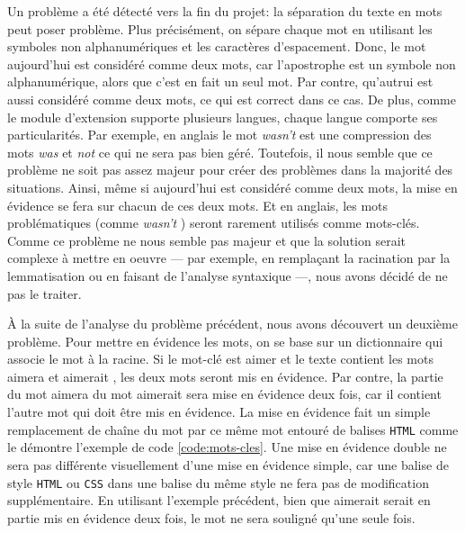Un probl\`eme a \'et\'e d\'etect\'e vers la fin du projet: la s\'eparation du texte en mots peut poser probl\`eme.
Plus pr\'ecis\'ement, on s\'epare chaque mot en utilisant les symboles non alphanum\'eriques et les caract\`eres d'espacement.
Donc, le mot \og aujourd'hui \fg{} est consid\'er\'e comme deux mots, car l'apostrophe est un symbole non alphanum\'erique, alors que c'est en fait un seul mot.
Par contre, \og qu'autrui \fg{} est aussi consid\'er\'e comme deux mots, ce qui est correct dans ce cas.
De plus, comme le module d'extension supporte plusieurs langues, chaque langue comporte ses particularit\'es.
Par exemple, en anglais le mot \og \textit{wasn't} \fg{} est une compression des mots \og \textit{was} \fg{} et \og \textit{not} \fg{} ce qui ne sera pas bien g\'er\'e.
Toutefois, il nous semble que ce probl\`eme ne soit pas assez majeur pour cr\'eer des probl\`emes dans la majorit\'e des situations.
Ainsi, m\^eme si \og aujourd'hui \fg{} est consid\'er\'e comme deux mots, la mise en \'evidence se fera sur chacun de ces deux mots.
Et en anglais, les mots probl\'ematiques (comme \og \textit{wasn't} \fg{}) seront rarement utilis\'es comme mots-cl\'es.
Comme ce probl\`eme ne nous semble pas majeur et que la solution serait complexe \`a mettre en oeuvre --- par exemple, en rempla\c{c}ant la racination par la lemmatisation ou en faisant de l'analyse syntaxique ---, nous avons d\'ecidé de ne pas le traiter.

\`A la suite de l'analyse du probl\`eme pr\'ec\'edent, nous avons d\'ecouvert un deuxi\`eme probl\`eme.
Pour mettre en \'evidence les mots, on se base sur un dictionnaire qui associe le mot \`a la racine.
Si le mot-cl\'e est \og aimer \fg{} et le texte contient les mots \og aimera \fg{} et \og aimerait \fg{}, les deux mots seront mis en \'evidence.
Par contre, la partie du mot \og aimera \fg{} du mot \og aimerait \fg{} sera mise en \'evidence deux fois, car il contient l'autre mot qui doit \^etre mis en \'evidence.
La mise en \'evidence fait un simple remplacement de cha\^ine du mot par ce m\^eme mot entour\'e de balises \texttt{HTML} comme le d\'emontre l'exemple de code \ref{code:mots-cles}.
Une mise en \'evidence double ne sera pas diff\'erente visuellement d'une mise en \'evidence simple, car une balise de style \texttt{HTML} ou \texttt{CSS} dans une balise du m\^eme style ne fera pas de modification suppl\'ementaire.
En utilisant l'exemple pr\'ec\'edent, bien que \og aimerait \fg{} serait en partie mis en \'evidence deux fois, le mot ne sera soulign\'e qu'une seule fois.

